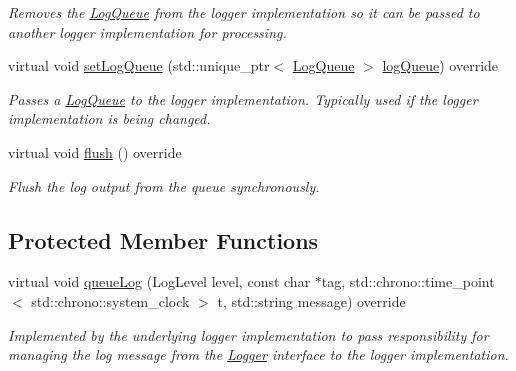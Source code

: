 \begin{DoxyCompactItemize}
\begin{DoxyCompactList}\small\item\em Removes the \hyperlink{class_aws_1_1_iot_1_1_device_client_1_1_logging_1_1_log_queue}{Log\+Queue} from the logger implementation so it can be passed to another logger implementation for processing. \end{DoxyCompactList}\item 
virtual void \hyperlink{class_aws_1_1_iot_1_1_device_client_1_1_logging_1_1_std_out_logger_aa35c525dc9aa3fef0f1f244781d304ea}{set\+Log\+Queue} (std\+::unique\+\_\+ptr$<$ \hyperlink{class_aws_1_1_iot_1_1_device_client_1_1_logging_1_1_log_queue}{Log\+Queue} $>$ \hyperlink{class_aws_1_1_iot_1_1_device_client_1_1_logging_1_1_std_out_logger_a0c39b3bc0fa3164c5efc793fa54c58eb}{log\+Queue}) override
\begin{DoxyCompactList}\small\item\em Passes a \hyperlink{class_aws_1_1_iot_1_1_device_client_1_1_logging_1_1_log_queue}{Log\+Queue} to the logger implementation. Typically used if the logger implementation is being changed. \end{DoxyCompactList}\item 
virtual void \hyperlink{class_aws_1_1_iot_1_1_device_client_1_1_logging_1_1_std_out_logger_a27610c8adc232399266ef8c8f09eb46b}{flush} () override
\begin{DoxyCompactList}\small\item\em Flush the log output from the queue synchronously. \end{DoxyCompactList}\end{DoxyCompactItemize}
\subsection*{Protected Member Functions}
\begin{DoxyCompactItemize}
\item 
virtual void \hyperlink{class_aws_1_1_iot_1_1_device_client_1_1_logging_1_1_std_out_logger_a829dd9d573157d3cbc6865b38572dd85}{queue\+Log} (Log\+Level level, const char $\ast$tag, std\+::chrono\+::time\+\_\+point$<$ std\+::chrono\+::system\+\_\+clock $>$ t, std\+::string message) override
\begin{DoxyCompactList}\small\item\em Implemented by the underlying logger implementation to pass responsibility for managing the log message from the \hyperlink{class_aws_1_1_iot_1_1_device_client_1_1_logging_1_1_logger}{Logger} interface to the logger implementation. \end{DoxyCompactList}\end{DoxyCompactItemize}
